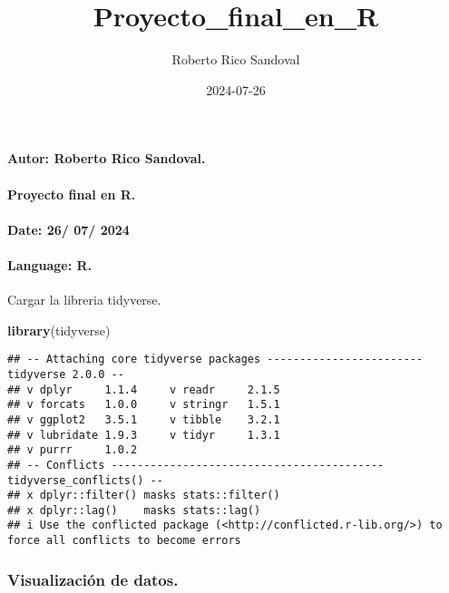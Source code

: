 \documentclass[
]{article}
\title{Proyecto\_final\_en\_R}
\author{Roberto Rico Sandoval}
\date{2024-07-26}
\newenvironment{Shaded}{\begin{snugshade}}{\end{snugshade}}
\newcommand{\FunctionTok}[1]{\textcolor[rgb]{0.13,0.29,0.53}{\textbf{#1}}}
\newcommand{\NormalTok}[1]{#1}
\begin{document}
\maketitle

\paragraph{Autor: Roberto Rico
Sandoval.}\label{autor-roberto-rico-sandoval.}

\paragraph{Proyecto final en R.}\label{proyecto-final-en-r.}

\paragraph{Date: 26/ 07/ 2024}\label{date-26-07-2024}

\paragraph{Language: R.}\label{language-r.}

Cargar la libreria tidyverse.

\begin{Shaded}
\begin{Highlighting}[]
\FunctionTok{library}\NormalTok{(tidyverse)}
\end{Highlighting}
\end{Shaded}

\begin{verbatim}
## -- Attaching core tidyverse packages ------------------------ tidyverse 2.0.0 --
## v dplyr     1.1.4     v readr     2.1.5
## v forcats   1.0.0     v stringr   1.5.1
## v ggplot2   3.5.1     v tibble    3.2.1
## v lubridate 1.9.3     v tidyr     1.3.1
## v purrr     1.0.2     
## -- Conflicts ------------------------------------------ tidyverse_conflicts() --
## x dplyr::filter() masks stats::filter()
## x dplyr::lag()    masks stats::lag()
## i Use the conflicted package (<http://conflicted.r-lib.org/>) to force all conflicts to become errors
\end{verbatim}

\subsubsection{Visualización de
datos.}\label{visualizaciuxf3n-de-datos.}
\end{document}
